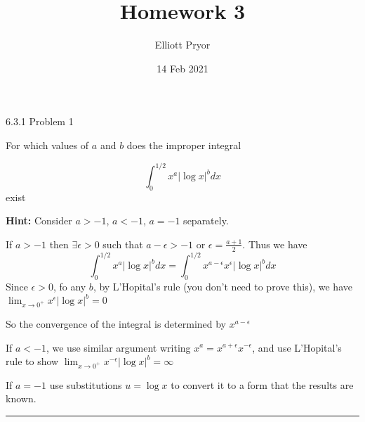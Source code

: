\documentclass[11pt]{article}
\title{Homework 3}
\author{Elliott Pryor}
\date{14 Feb 2021}
\begin{document}
\maketitle

 6.3.1 Problem 1

For which values of $a$ and $b$ does the improper integral

$$\int_0 ^{1/2} x^a | \log x|^b dx$$
exist


\textbf{Hint:} Consider $a > -1$, $a < -1$, $a = -1$ separately.

If $a > -1$ then $\exists \epsilon > 0$ such that $a - \epsilon > -1$ or $\epsilon = \frac{a +1}{2}$. 
Thus we have $$\int_0 ^{1/2} x^a | \log x|^b dx = \int_0 ^{1/2} x^{a - \epsilon} x^\epsilon | \log x|^b dx$$
Since $\epsilon > 0$, fo any $b$, by L'Hopital's rule (you don't need to prove this), we have $\lim_{x \to 0^+} x^\epsilon |\log x|^b = 0$

So the convergence of the integral is determined by $x^{a - \epsilon}$

If $a < -1$, we use similar argument writing $x^a = x^{a + \epsilon} x ^{- \epsilon}$, and use L'Hopital's rule to show
$\lim_{x \to 0^+} x^{-\epsilon}| \log x |^b = \infty$

If $a = -1$ use substitutions $u = \log x$ to convert it to a form that the results are known.

\hrule
\end{document}
